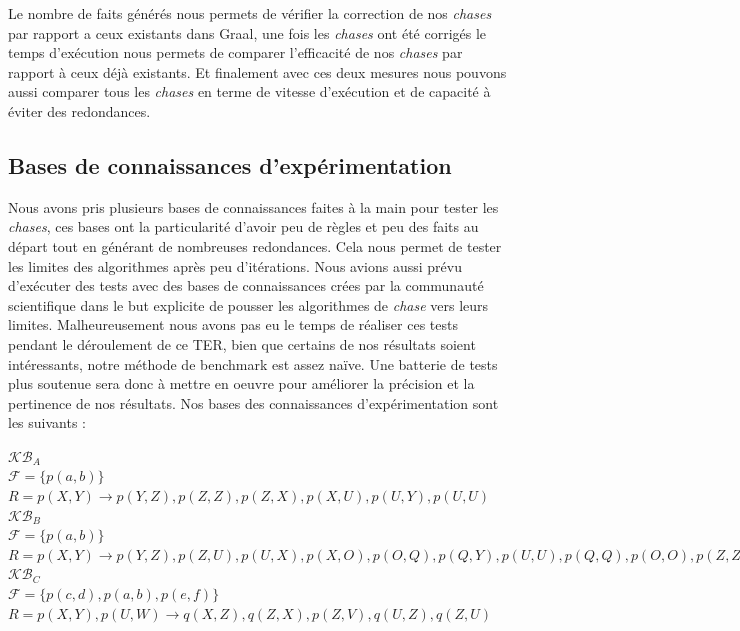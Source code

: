 Le nombre de faits générés nous permets de vérifier la correction de nos \textit{chases} par rapport a ceux existants dans Graal, une fois les \textit{chases} ont été corrigés le temps d'exécution nous permets de comparer l'efficacité de nos \textit{chases} par rapport à ceux déjà existants. Et finalement avec ces deux mesures nous pouvons aussi comparer tous les \textit{chases} en terme de vitesse d'exécution et de capacité à éviter des redondances.

\subsection{Bases de connaissances d'expérimentation}

Nous avons pris plusieurs bases de connaissances faites à la main pour tester les \textit{chases}, ces bases ont la particularité d'avoir peu de règles et peu des faits au départ tout en générant de nombreuses redondances. Cela nous permet de tester les limites des algorithmes après peu d'itérations. Nous avions aussi prévu d'exécuter des tests avec des bases de connaissances crées par la communauté scientifique dans le but explicite de pousser les algorithmes de \textit{chase} vers leurs limites. Malheureusement nous avons pas eu le temps de réaliser ces tests pendant le déroulement de ce TER, bien que certains de nos résultats soient intéressants, notre méthode de benchmark est assez naïve. Une batterie de tests plus soutenue sera donc à mettre en oeuvre pour améliorer la précision et la pertinence de nos résultats. Nos bases des connaissances d'expérimentation sont les suivants : 

\vspace{10pt}
\textbf{$\mathcal{KB}_A$}\\
$\mathcal{F} = \{p(a,b)\}$ \\
$R = p(X,Y) \rightarrow p(Y,Z), p(Z,Z), p(Z,X), p(X,U), p(U,Y), p(U,U)$\\

\textbf{$\mathcal{KB}_B$}\\
$\mathcal{F} = \{p(a,b)\}$ \\
$R = p(X,Y) \rightarrow p(Y,Z), p(Z,U), p(U,X), p(X,O), p(O,Q), p(Q,Y), p(U,U), p(Q,Q), p(O,O), p(Z,Z)$\\

\textbf{$\mathcal{KB}_C$}\\
$\mathcal{F} = \{p(c,d), p(a,b), p(e,f)\}$ \\
$R = p(X,Y), p(U,W) \rightarrow q(X,Z), q(Z,X), p(Z,V), q(U,Z), q(Z,U)$\\


